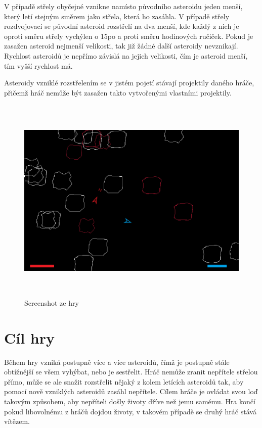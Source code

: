\par
V případě střely obyčejné vznikne namísto původního asteroidu jeden menší, který letí stejným směrem jako střela, která ho zasáhla.
V případě střely rozdvojovací se původní asteroid rozstřelí na dva menší, kde každý z nich je oproti směru střely vychýlen o 15\textdegree po a proti směru hodinových ručiček.
Pokud je zasažen asteroid nejmenší velikosti, tak již žádné další asteroidy nevznikají. 
Rychlost asteroidů je nepřímo závislá na jejich velikosti, čím je asteroid menší, tím vyšší rychlost má.
\par
Asteroidy vzniklé rozstřelením se v jistém pojetí stávají projektily daného hráče, přičemž hráč nemůže být zasažen takto vytvořenými vlastními projektily.

\begin{figure}[p]

\includegraphics[width=150mm, height=100mm]{./Obrazky/UkazkaHry.png}
\caption{Screenshot ze hry}
\label{obr01:}
\end{figure}


\section{Cíl hry}
Během hry vzniká postupně více a více asteroidů, čímž je postupně stále obtížnější se všem vyhýbat, nebo je sestřelit.
Hráč nemůže zranit nepřítele střelou přímo, může se ale snažit rozstřelit nějaký z kolem letících asteroidů tak, aby pomocí nově vzniklých asteroidů zasáhl nepřítele.
Cílem hráče je ovládat svou loď takovým způsobem, aby nepříteli došly životy dříve než jemu samému. Hra končí pokud libovolnému z hráčů dojdou životy, v takovém případě se druhý hráč stává vítězem.

